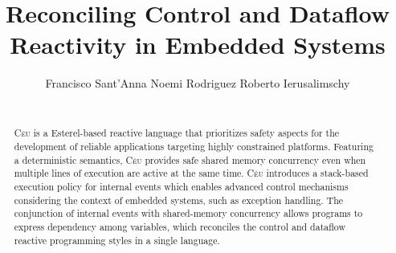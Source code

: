 \documentclass{acm_proc_article-sp}
\newcommand{\CEU}{\textsc{C\'{e}u}\xspace}
\newcommand{\1}{\;}
\newcommand{\2}{\;\;}
\newcommand{\3}{\;\;\;}
\newcommand{\5}{\;\;\;\;\;}
\begin{document}

\title {
    Reconciling Control and Dataflow Reactivity in Embedded Systems
}

\author{
    \alignauthor
    Francisco Sant'Anna \hspace{1cm} Noemi Rodriguez \hspace{1cm} Roberto Ierusalimschy   \\
     \\
}

\maketitle

\begin{abstract}
\CEU is a Esterel-based reactive language that prioritizes safety aspects for 
the development of reliable applications targeting highly constrained 
platforms.
%
Featuring a deterministic semantics, \CEU provides safe shared memory 
concurrency even when multiple lines of execution are active at the same time.
%
\CEU introduces a stack-based execution policy for internal events which 
enables advanced control mechanisms considering the context of embedded 
systems, such as exception handling.
%
The conjunction of internal events with shared-memory concurrency allows 
programs to express dependency among variables, which reconciles the control 
and dataflow reactive programming styles in a single language.
%
\end{abstract}

\end{document}
